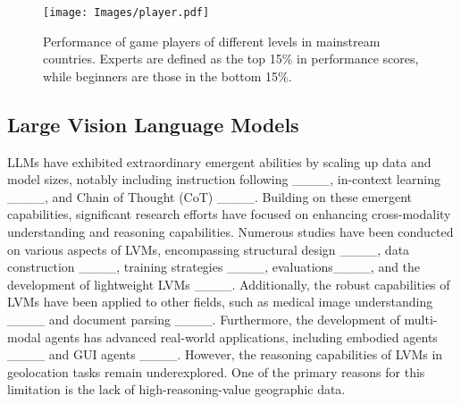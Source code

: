 


\begin{figure*}[htb]
    \centering
    \texttt{[image: Images/player.pdf]}
    \caption{Performance of game players of different levels in mainstream countries.
    Experts are defined as the top 15\% in performance scores, while beginners are those in the bottom 15\%.
    }
    \label{fig:player_score}
\end{figure*}

\subsection{Large Vision Language Models}

LLMs have exhibited extraordinary emergent abilities by scaling up data and model sizes, notably including instruction following ____, in-context learning ____, and Chain of Thought (CoT) ____.
Building on these emergent capabilities, significant research efforts have focused on enhancing cross-modality understanding and reasoning capabilities. 
Numerous studies have been conducted on various aspects of LVMs, encompassing structural design ____, data construction ____, training strategies ____, evaluations____, and the development of lightweight LVMs ____.
Additionally, the robust capabilities of LVMs have been applied to other fields, such as medical image understanding ____ and document parsing ____. 
Furthermore, the development of multi-modal agents has advanced real-world applications, including embodied agents ____ and GUI agents ____.
However, the reasoning capabilities of LVMs in geolocation tasks remain underexplored. 
One of the primary reasons for this limitation is the lack of high-reasoning-value geographic data. 




